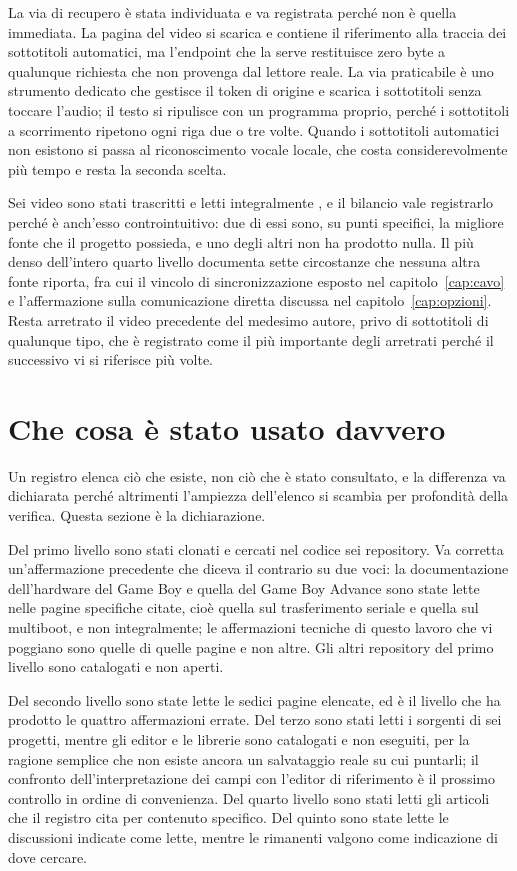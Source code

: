 La via di recupero è stata individuata e va registrata perché non è quella immediata. La pagina del video si scarica e contiene il riferimento alla traccia dei sottotitoli automatici, ma l'endpoint che la serve restituisce zero byte a qualunque richiesta che non provenga dal lettore reale. La via praticabile è uno strumento dedicato che gestisce il token di origine e scarica i sottotitoli senza toccare l'audio; il testo si ripulisce con un programma proprio, perché i sottotitoli a scorrimento ripetono ogni riga due o tre volte. Quando i sottotitoli automatici non esistono si passa al riconoscimento vocale locale, che costa considerevolmente più tempo e resta la seconda scelta.

Sei video sono stati trascritti e letti integralmente \cite{video-goppier,video-trascritti}, e il bilancio vale registrarlo perché è anch'esso controintuitivo: due di essi sono, su punti specifici, la migliore fonte che il progetto possieda, e uno degli altri non ha prodotto nulla. Il più denso dell'intero quarto livello documenta sette circostanze che nessuna altra fonte riporta, fra cui il vincolo di sincronizzazione esposto nel capitolo~\ref{cap:cavo} e l'affermazione sulla comunicazione diretta discussa nel capitolo~\ref{cap:opzioni}. Resta arretrato il video precedente del medesimo autore, privo di sottotitoli di qualunque tipo, che è registrato come il più importante degli arretrati perché il successivo vi si riferisce più volte.

\section{Che cosa è stato usato davvero}

Un registro elenca ciò che esiste, non ciò che è stato consultato, e la differenza va dichiarata perché altrimenti l'ampiezza dell'elenco si scambia per profondità della verifica. Questa sezione è la dichiarazione.

Del primo livello sono stati clonati e cercati nel codice sei repository. Va corretta un'affermazione precedente che diceva il contrario su due voci: la documentazione dell'hardware del Game Boy e quella del Game Boy Advance sono state lette nelle pagine specifiche citate, cioè quella sul trasferimento seriale e quella sul multiboot, e non integralmente; le affermazioni tecniche di questo lavoro che vi poggiano sono quelle di quelle pagine e non altre. Gli altri repository del primo livello sono catalogati e non aperti.

Del secondo livello sono state lette le sedici pagine elencate, ed è il livello che ha prodotto le quattro affermazioni errate. Del terzo sono stati letti i sorgenti di sei progetti, mentre gli editor e le librerie sono catalogati e non eseguiti, per la ragione semplice che non esiste ancora un salvataggio reale su cui puntarli; il confronto dell'interpretazione dei campi con l'editor di riferimento è il prossimo controllo in ordine di convenienza. Del quarto livello sono stati letti gli articoli che il registro cita per contenuto specifico. Del quinto sono state lette le discussioni indicate come lette, mentre le rimanenti valgono come indicazione di dove cercare.


